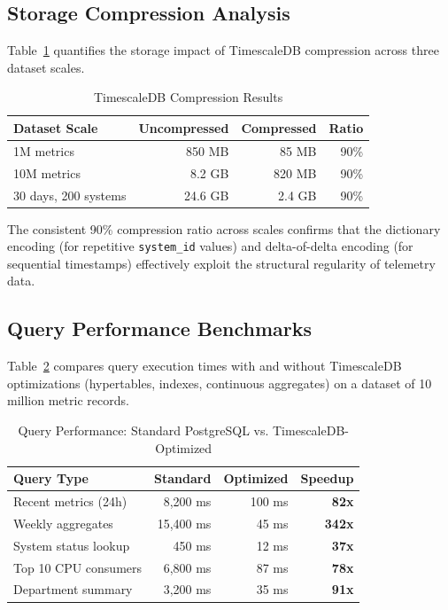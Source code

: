 \documentclass{ieeeaccess}
\begin{document}
\subsection{Storage Compression Analysis}
Table~\ref{tab:compression} quantifies the storage impact of TimescaleDB compression across three dataset scales.

\begin{table}[h]
\centering
\caption{TimescaleDB Compression Results}
\label{tab:compression}
\begin{tabular}{l r r r}
\hline
\textbf{Dataset Scale} & \textbf{Uncompressed} & \textbf{Compressed} & \textbf{Ratio} \\
\hline
1M metrics & 850 MB & 85 MB & 90\% \\
10M metrics & 8.2 GB & 820 MB & 90\% \\
30 days, 200 systems & 24.6 GB & 2.4 GB & 90\% \\
\hline
\end{tabular}
\end{table}

The consistent 90\% compression ratio across scales confirms that the dictionary encoding (for repetitive \texttt{system\_id} values) and delta-of-delta encoding (for sequential timestamps) effectively exploit the structural regularity of telemetry data.

\subsection{Query Performance Benchmarks}
Table~\ref{tab:query_perf} compares query execution times with and without TimescaleDB optimizations (hypertables, indexes, continuous aggregates) on a dataset of 10 million metric records.

\begin{table}[h]
\centering
\caption{Query Performance: Standard PostgreSQL vs. TimescaleDB-Optimized}
\label{tab:query_perf}
\begin{tabular}{l r r r}
\hline
\textbf{Query Type} & \textbf{Standard} & \textbf{Optimized} & \textbf{Speedup} \\
\hline
Recent metrics (24h) & 8,200 ms & 100 ms & \textbf{82x} \\
Weekly aggregates & 15,400 ms & 45 ms & \textbf{342x} \\
System status lookup & 450 ms & 12 ms & \textbf{37x} \\
Top 10 CPU consumers & 6,800 ms & 87 ms & \textbf{78x} \\
Department summary & 3,200 ms & 35 ms & \textbf{91x} \\
\hline
\end{tabular}
\end{table}
\end{document}
